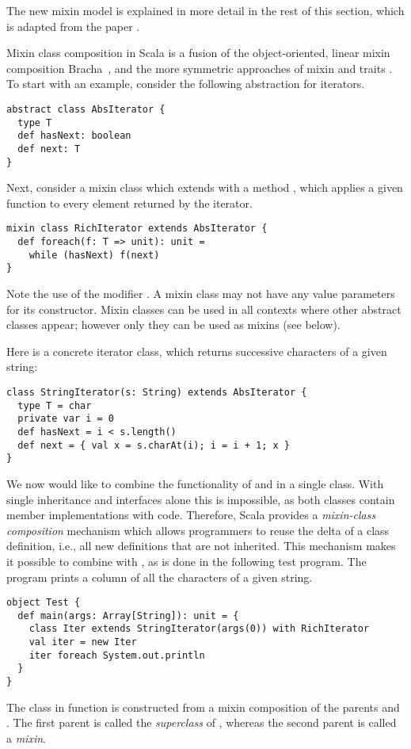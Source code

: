 \documentclass[a4paper,11pt,twoside]{article}
\begin{document}
The new mixin model is explained in more detail in the rest of this
section, which is adapted from the paper \cite{odersky05sca}.

Mixin class composition in Scala is a fusion of the object-oriented,
linear mixin composition Bracha~\cite{bracha90mixinbased}, and the
more symmetric approaches of mixin
\cite{duggan96mixins,hirschowitz-leory:02mixin} and traits
\cite{schaerli03traits}.  To start with an example, consider the
following abstraction for iterators.
\begin{lstlisting}
abstract class AbsIterator {
  type T
  def hasNext: boolean
  def next: T
}
\end{lstlisting}
Next, consider a mixin class which extends \lstinline@AbsIterator@
with a method \lstinline@foreach@, which applies a given function to
every element returned by the iterator.
\begin{lstlisting}
mixin class RichIterator extends AbsIterator {
  def foreach(f: T => unit): unit = 
    while (hasNext) f(next)
}
\end{lstlisting}
Note the use of the modifier \lstinline@mixin@. A mixin class may not
have any value parameters for its constructor.  Mixin classes can be
used in all contexts where other abstract classes appear; however only
they can be used as mixins (see below). 

Here is a concrete iterator class, which returns successive characters
of a given string:
\begin{lstlisting}
class StringIterator(s: String) extends AbsIterator {
  type T = char
  private var i = 0
  def hasNext = i < s.length()
  def next = { val x = s.charAt(i); i = i + 1; x }
}
\end{lstlisting}
We now would like to combine the functionality of
\lstinline@RichIterator@ and \lstinline@StringIterator@ in a single
class. With single inheritance and interfaces alone this is
impossible, as both classes contain member implementations with code.
Therefore,
Scala provides a \emph{mixin-class composition} mechanism which
allows programmers to reuse the delta of a class definition, i.e., all
new definitions that are not inherited. This mechanism makes it
possible to combine \lstinline@RichIterator@ with
\lstinline@StringIterator@, as is done in the following test program.
The program prints a column of all the characters of a given string.
\begin{lstlisting}
object Test {
  def main(args: Array[String]): unit = {
    class Iter extends StringIterator(args(0)) with RichIterator
    val iter = new Iter
    iter foreach System.out.println 
  }
}
\end{lstlisting}
The \lstinline@Iter@ class in function \lstinline@main@ is constructed
from a mixin composition of the parents \lstinline@StringIterator@ and
\lstinline@RichIterator@. The first parent is called the {\em
superclass} of \lstinline@Iter@, whereas the second parent is called a
{\em mixin}. 
\medskip
\end{document}
